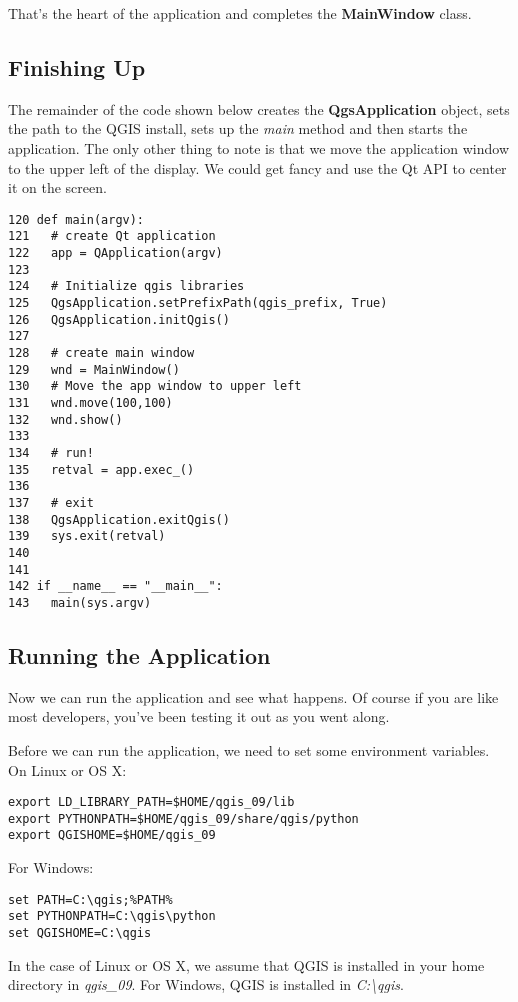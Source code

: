 That's the heart of the application and completes the \textbf{MainWindow} class. 

\subsection{Finishing Up}

The remainder of the code shown below 
creates the \textbf{QgsApplication} object, sets the path to the QGIS install, sets
up the \textsl{main} method and then starts the application. The only other thing to note is that we move the
application window to the upper left of the display. We could get fancy and use the Qt API to center it on the screen.

\begin{verbatim}
120 def main(argv):
121   # create Qt application
122   app = QApplication(argv)
123 
124   # Initialize qgis libraries
125   QgsApplication.setPrefixPath(qgis_prefix, True)
126   QgsApplication.initQgis()
127 
128   # create main window
129   wnd = MainWindow()
130   # Move the app window to upper left
131   wnd.move(100,100)
132   wnd.show()
133 
134   # run!
135   retval = app.exec_()
136   
137   # exit
138   QgsApplication.exitQgis()
139   sys.exit(retval)
140 
141 
142 if __name__ == "__main__":
143   main(sys.argv)
\end{verbatim}

\subsection{Running the Application}

Now we can run the application and see what happens. Of course if you are like most developers, you've been testing it
out as you went along. 

Before we can run the application, we need to set some environment variables. On Linux or OS X:

\begin{verbatim}
export LD_LIBRARY_PATH=$HOME/qgis_09/lib
export PYTHONPATH=$HOME/qgis_09/share/qgis/python
export QGISHOME=$HOME/qgis_09
\end{verbatim}

For Windows:
\begin{verbatim}
set PATH=C:\qgis;%PATH%
set PYTHONPATH=C:\qgis\python
set QGISHOME=C:\qgis
\end{verbatim}

In the case of Linux or OS X, we assume that QGIS is installed in your home directory in 
\textsl{qgis\_09}. For Windows, QGIS is installed in \textsl{C:\textbackslash qgis}.

